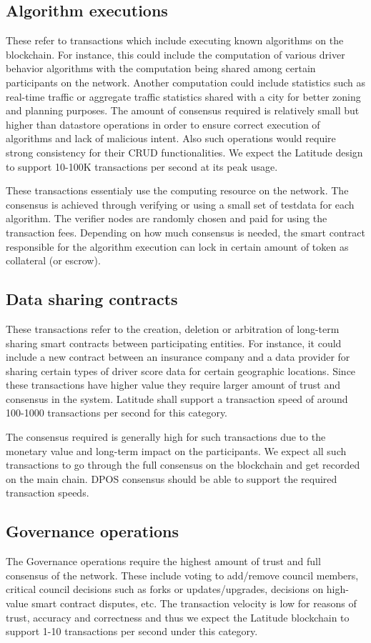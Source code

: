 \subsection{Algorithm executions}
These refer to transactions which include executing known algorithms on the blockchain. For instance, this could include
the computation of various driver behavior algorithms with the computation being shared among certain participants on
the network. Another computation could include statistics such as real-time traffic or aggregate traffic statistics
shared with a city for better zoning and planning purposes. The amount of consensus required is relatively small but
higher than datastore operations in order to ensure correct execution of algorithms and lack of malicious intent. Also
such operations would require strong consistency for their CRUD functionalities. We expect the Latitude design to
support 10-100K transactions per second at its peak usage.

These transactions essentialy use the computing resource on the network. The consensus is achieved through verifying or
using a small set of testdata for each algorithm. The verifier nodes are randomly chosen and paid for using the
transaction fees. Depending on how much consensus is needed, the smart contract responsible for the algorithm execution
can lock in certain amount of token as collateral (or escrow).

\subsection{Data sharing contracts}
These transactions refer to the creation, deletion or arbitration of long-term sharing smart contracts between
participating entities. For instance, it could include a new contract between an insurance company and a data provider
for sharing certain types of driver score data for certain geographic locations. Since these transactions have higher
value they require larger amount of trust and consensus in the system. Latitude shall support a transaction speed of
around 100-1000 transactions per second for this category.

The consensus required is generally high for such transactions due to the monetary value and long-term impact on the
participants. We expect all such transactions to go through the full consensus on the blockchain and get recorded on the
main chain. DPOS consensus should be able to support the required transaction speeds. 

\subsection{Governance operations}
The Governance operations require the highest amount of trust and full consensus of the network. These include voting to
add/remove council members, critical council decisions such as forks or updates/upgrades, decisions on high-value smart
contract disputes, etc. The transaction velocity is low for reasons of trust, accuracy and correctness and thus we
expect the Latitude blockchain to support 1-10 transactions per second under this category.

